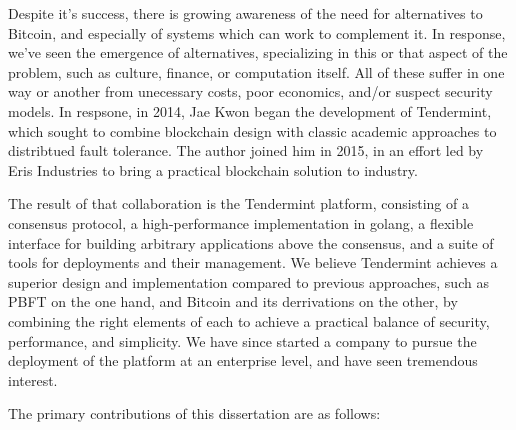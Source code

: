 Despite it's success, there is growing awareness of the need for alternatives to Bitcoin, and especially of systems which can work to complement it.
In response, we've seen the emergence of alternatives, specializing in this or that aspect of the problem, such as culture, finance, or computation itself.
All of these suffer in one way or another from unecessary costs, poor economics, and/or suspect security models.
In respsone, in 2014, Jae Kwon began the development of Tendermint, which sought to combine blockchain design with classic academic approaches to distribtued fault tolerance.
The author joined him in 2015, in an effort led by Eris Industries to bring a practical blockchain solution to industry.

The result of that collaboration is the Tendermint platform, consisting of a consensus protocol, a high-performance implementation in golang, 
a flexible interface for building arbitrary applications above the consensus, and a suite of tools for deployments and their management.
We believe Tendermint achieves a superior design and implementation compared to previous approaches, such as PBFT on the one hand, and Bitcoin and its derrivations on the other,
by combining the right elements of each to achieve a practical balance of security, performance, and simplicity.
We have since started a company to pursue the deployment of the platform at an enterprise level, and have seen tremendous interest.

The primary contributions of this dissertation are as follows:


